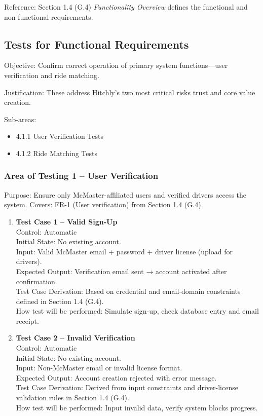 \documentclass[12pt, titlepage]{article}
\begin{document}
Reference: Section 1.4 (G.4) \textit{Functionality Overview} defines the functional and non-functional requirements.

\subsection{Tests for Functional Requirements}

Objective: Confirm correct operation of primary system functions—user verification and ride matching.

Justification: These address Hitchly’s two most critical risks trust and core value creation.

Sub-areas:
\begin{itemize}
    \item 4.1.1 User Verification Tests
    \item 4.1.2 Ride Matching Tests
\end{itemize}

\subsubsection{Area of Testing 1 – User Verification}

Purpose: Ensure only McMaster-affiliated users and verified drivers access the system.  
Covers: FR-1 (User verification) from Section 1.4 (G.4).

\begin{enumerate}
\item \textbf{Test Case 1 – Valid Sign-Up}\\
Control: Automatic\\
Initial State: No existing account.\\
Input: Valid McMaster email + password + driver license (upload for drivers).\\
Expected Output: Verification email sent → account activated after confirmation.\\
Test Case Derivation: Based on credential and email-domain constraints defined in Section 1.4 (G.4).\\
How test will be performed: Simulate sign-up, check database entry and email receipt.\\[5pt]

\item \textbf{Test Case 2 – Invalid Verification}\\
Control: Automatic\\
Initial State: No existing account.\\
Input: Non-McMaster email or invalid license format.\\
Expected Output: Account creation rejected with error message.\\
Test Case Derivation: Derived from input constraints and driver-license validation rules in Section 1.4 (G.4).\\
How test will be performed: Input invalid data, verify system blocks progress.\\
\end{enumerate}
\end{document}
